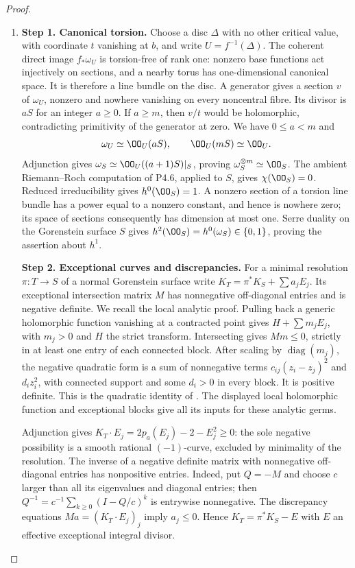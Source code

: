 \begin{proof}
\begin{enumerate}[label={$\langle1\rangle$\arabic*.},leftmargin=*]
\item 
\noindent\textbf{Step 1. Canonical torsion.}
Choose a disc $\Delta$ with no other critical value, with coordinate
$t$ vanishing at $b$, and write $U=f^{-1}(\Delta)$. The coherent
direct image $f_*\omega_U$ is torsion-free of rank one: nonzero
base functions act injectively on sections, and a nearby torus has
one-dimensional canonical space. It is therefore a line bundle
on the disc. A generator gives a section $v$ of $\omega_U$,
nonzero and nowhere vanishing on every noncentral fibre. Its
divisor is $aS$ for an integer $a\ge0$. If $a\ge m$, then $v/t$
would be holomorphic, contradicting primitivity of the generator
at zero. We have $0\le a<m$ and
\[
 \omega_U\simeq\OO_U(aS),\qquad\OO_U(mS)\simeq\OO_U.
\]
Adjunction gives $\omega_S\simeq\OO_U((a+1)S)|_S$, proving
$\omega_S^{\otimes m}\simeq\OO_S$. The ambient
Riemann--Roch computation of P4.6, applied to $S$, gives
$\chi(\OO_S)=0$. Reduced irreducibility gives $h^0(\OO_S)=1$.
A nonzero section of a torsion line bundle has a power equal to
a nonzero constant, and hence is nowhere zero; its space of
sections consequently has dimension at most one. Serre duality
on the Gorenstein surface $S$ gives
$h^2(\OO_S)=h^0(\omega_S)\in\{0,1\}$, proving the assertion
about $h^1$.

\noindent\textbf{Step 2. Exceptional curves and discrepancies.}
For a minimal resolution $\pi:T\to S$ of a normal Gorenstein
surface write $K_T=\pi^*K_S+\sum a_jE_j$. Its exceptional
intersection matrix $M$ has nonnegative off-diagonal entries
and is negative definite. We recall the local analytic proof.
Pulling back a generic holomorphic function vanishing at a
contracted point gives $H+\sum m_jE_j$, with $m_j>0$ and $H$
the strict transform. Intersecting gives $Mm\le0$, strictly in
at least one entry of each connected block. After scaling by
$\operatorname{diag}(m_j)$, the negative quadratic form is a
sum of nonnegative terms $c_{ij}(z_i-z_j)^2$ and $d_i z_i^2$,
with connected support and some $d_i>0$ in every block. It is
positive definite. This is the quadratic identity of
\cite[\S I, unnumbered assertion and proof, p.~6]{Mumford1961}.
The displayed local holomorphic function and exceptional blocks give
all its inputs for these analytic germs.

Adjunction gives
$K_T\cdot E_j=2p_a(E_j)-2-E_j^2\ge0$: the sole negative
possibility is a smooth rational $(-1)$-curve, excluded by
minimality of the resolution. The inverse of a negative definite
matrix with nonnegative off-diagonal entries has nonpositive
entries. Indeed, put $Q=-M$ and choose $c$ larger than all its
eigenvalues and diagonal entries; then
$Q^{-1}=c^{-1}\sum_{k\ge0}(I-Q/c)^k$ is entrywise nonnegative.
The discrepancy equations $Ma=(K_T\cdot E_j)_j$ imply
$a_j\le0$. Hence $K_T=\pi^*K_S-E$ with $E$ an effective
exceptional integral divisor.


\end{enumerate}
\end{proof}
